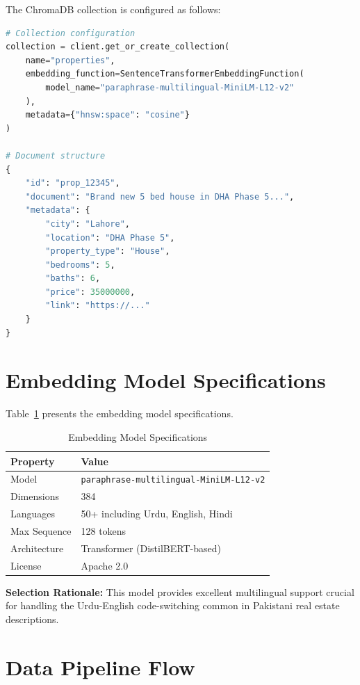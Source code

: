 The ChromaDB collection is configured as follows:

\begin{lstlisting}[language=Python, caption={ChromaDB Collection Configuration}, label=lst:chroma-config]
# Collection configuration
collection = client.get_or_create_collection(
    name="properties",
    embedding_function=SentenceTransformerEmbeddingFunction(
        model_name="paraphrase-multilingual-MiniLM-L12-v2"
    ),
    metadata={"hnsw:space": "cosine"}
)

# Document structure
{
    "id": "prop_12345",
    "document": "Brand new 5 bed house in DHA Phase 5...",
    "metadata": {
        "city": "Lahore",
        "location": "DHA Phase 5",
        "property_type": "House",
        "bedrooms": 5,
        "baths": 6,
        "price": 35000000,
        "link": "https://..."
    }
}
\end{lstlisting}

\section{Embedding Model Specifications}

Table~\ref{tab:embedding-specs} presents the embedding model specifications.

\begin{table}[!htbp]
\centering
\caption{Embedding Model Specifications}
\label{tab:embedding-specs}
\begin{tabular}{|l|l|}
\hline
\textbf{Property} & \textbf{Value} \\ \hline
Model & \texttt{paraphrase-multilingual-MiniLM-L12-v2} \\ \hline
Dimensions & 384 \\ \hline
Languages & 50+ including Urdu, English, Hindi \\ \hline
Max Sequence & 128 tokens \\ \hline
Architecture & Transformer (DistilBERT-based) \\ \hline
License & Apache 2.0 \\ \hline
\end{tabular}
\end{table}

\textbf{Selection Rationale:} This model provides excellent multilingual support crucial for handling the Urdu-English code-switching common in Pakistani real estate descriptions.

\section{Data Pipeline Flow}

